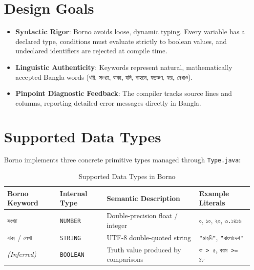 \documentclass[12pt, a4paper]{report}
\begin{document}
\section{Design Goals}
\begin{itemize}
    \item \textbf{Syntactic Rigor}: Borno avoids loose, dynamic typing. Every variable has a declared type, conditions must evaluate strictly to boolean values, and undeclared identifiers are rejected at compile time.
    \item \textbf{Linguistic Authenticity}: Keywords represent natural, mathematically accepted Bangla words (\texttt{ধরি}, \texttt{সংখ্যা}, \texttt{বাক্য}, \texttt{যদি}, \texttt{নাহলে}, \texttt{যতক্ষণ}, \texttt{ফর}, \texttt{দেখাও}).
    \item \textbf{Pinpoint Diagnostic Feedback}: The compiler tracks source lines and columns, reporting detailed error messages directly in Bangla.
\end{itemize}

\section{Supported Data Types}
Borno implements three concrete primitive types managed through \texttt{Type.java}:
\begin{table}[htbp]
\centering
\small
\renewcommand{\arraystretch}{1.25}
\begin{tabular}{|l|l|l|l|}
\hline
\textbf{Borno Keyword} & \textbf{Internal Type} & \textbf{Semantic Description} & \textbf{Example Literals} \\
\hline
\texttt{সংখ্যা} & \texttt{NUMBER} & Double-precision float / integer & \texttt{০}, \texttt{১০}, \texttt{২০}, \texttt{৩.১৪১৬} \\
\hline
\texttt{বাক্য} / \texttt{লেখা} & \texttt{STRING} & UTF-8 double-quoted string & \texttt{"মাহদি"}, \texttt{"বাংলাদেশ"} \\
\hline
\textit{(Inferred)} & \texttt{BOOLEAN} & Truth value produced by comparisons & \texttt{ক > ৫}, \texttt{বয়স >= ১৮} \\
\hline
\end{tabular}
\caption{Supported Data Types in Borno}
\label{tab:data_types}
\end{table}
\end{document}

